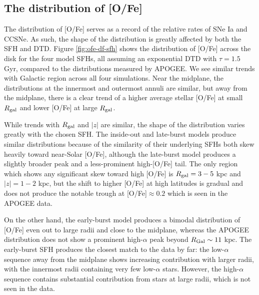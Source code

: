 \documentclass[modern,linenumbers]{aastex631}
\begin{document}

\subsection{The distribution of [O/Fe]}

The distribution of [O/Fe] serves as a record of the relative rates of SNe Ia and CCSNe. As such, the shape of the distribution is greatly affected by both the SFH and DTD. Figure \ref{fig:ofe-df-sfh} shows the distribution of [O/Fe] across the disk for the four model SFHs, all assuming an exponential DTD with $\tau=1.5$ Gyr, compared to the distributions measured by APOGEE. We see similar trends with Galactic region across all four simulations. Near the midplane, the distributions at the innermost and outermost annuli are similar, but away from the midplane, there is a clear trend of a higher average stellar [O/Fe] at small $R_{\rm gal}$ and lower [O/Fe] at large $R_{\rm gal}$.

While trends with $R_{\rm gal}$ and $|z|$ are similar, the shape of the distribution varies greatly with the chosen SFH. The inside-out and late-burst models produce similar distributions because of the similarity of their underlying SFHs \textemdash both skew heavily toward near-Solar [O/Fe], although the late-burst model produces a slightly broader peak and a less-prominent high-[O/Fe] tail. The only region which shows any significant skew toward high [O/Fe] is $R_{\rm gal}=3-5$ kpc and $|z|=1-2$ kpc, but the shift to higher [O/Fe] at high latitudes is gradual and does not produce the notable trough at [O/Fe]$\approx0.2$ which is seen in the APOGEE data. 

On the other hand, the early-burst model produces a bimodal distribution of [O/Fe] even out to large radii and close to the midplane, whereas the APOGEE distribution does not show a prominent high-$\alpha$ peak beyond $R_{\rm{Gal}}\sim11$ kpc. 
The early-burst SFH produces the closest match to the data by far: the low-$\alpha$ sequence away from the midplane shows increasing contribution with larger radii, with the innermost radii containing very few low-$\alpha$ stars. However, the high-$\alpha$ sequence contains substantial contribution from stars at large radii, which is not seen in the data.
\end{document}
